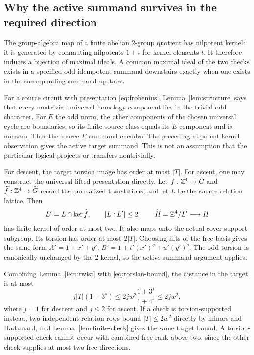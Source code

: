 \subsection{Why the active summand survives in the required direction}
The group-algebra map of a finite abelian $2$-group quotient has nilpotent kernel: it is generated by commuting nilpotents $1+t$ for kernel elements $t$. It therefore induces a bijection of maximal ideals. A common maximal ideal of the two checks exists in a specified odd idempotent summand downstairs exactly when one exists in the corresponding summand upstairs.

For a source circuit with presentation \eqref{eq:frobenius}, Lemma~\ref{lem:structure} says that every nontrivial universal homology component lies in the trivial odd character. For $E$ the odd norm, the other components of the chosen universal cycle are boundaries, so its finite source class equals its $E$ component and is nonzero. Thus the source $E$ summand encodes. The preceding nilpotent-kernel observation gives the active target summand. This is not an assumption that the particular logical projects or transfers nontrivially.

For descent, the target torsion image has order at most $|T|$. For ascent, one may construct the universal lifted presentation directly. Let $f:\mathbb Z^4\to G$ and $\widetilde f:\mathbb Z^4\to\widetilde G$ record the normalized translations, and let $L$ be the source relation lattice. Then
\[
 L'=L\cap\ker\widetilde f,\qquad [L:L']\le2,
 \qquad \widetilde H=\mathbb Z^4/L'\longrightarrow H
\]
has finite kernel of order at most two. It also maps onto the actual cover support subgroup. Its torsion has order at most $2|T|$. Choosing lifts of the free basis gives the same form $A'=1+x'+y'$, $B'=1+t'(x')^q+u'(y')^q$. The odd torsion is canonically unchanged by the $2$-kernel, so the active-summand argument applies.

Combining Lemma~\ref{lem:twist} with \eqref{eq:torsion-bound}, the distance in the target is at most
\begin{equation}\label{eq:ranktwo-target}
 j|T|(1+3^s)
 \le 2j w^2\frac{1+3^s}{1+4^s}
 \le2j w^2,
\end{equation}
where $j=1$ for descent and $j\le2$ for ascent. If a check is torsion-supported instead, two independent relation rows bound $|T|\le2w^2$ directly by minors and Hadamard, and Lemma~\ref{lem:finite-check} gives the same target bound. A torsion-supported check cannot occur with combined free rank above two, since the other check supplies at most two free directions.

